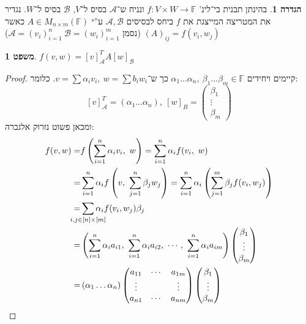 \documentclass[a4paper]{article}
\newcommand\ac    {\mathcal{A}}
\newcommand\bc    {\mathcal{B}}
\newcommand\F         {\mathbb{F}}
\newcommand\co        {\colon}
\newcommand\pms[1]    {\begin{pmatrix}
		#1
\end{pmatrix}}
\newcommand\ag        {\alpha}
\newcommand\bg        {\beta}
\newcommand\cl [1]    {\left ( #1 \right )}
\theoremstyle{definition}
\newtheorem{Theorem}{משפט}
\newtheorem{definition}{הגדרה}
\newcommand\theo  [1] {\begin{Theorem}#1\end{Theorem}}
\newcommand\defi  [1] {\begin{definition}#1\end{definition}}
\begin{document}
	\defi{בהינתן תבנית בי־לינ' $f \co V \times W \to \F$ ונניח ש־$\ac$ בסיס ל־$V$, $\bc$ בסיס ל־$W$. נגדיר את המטריצה המייצגת את $f$ ביחס לבסיסים $\ac, \bc$ ע''י $A \in M_{n \times m}(\F)$ כאשר $(A)_{ij} = f(v_i, w_j)$ (נסמן $\ac = (v_i)_{i =1}^n \ \bc = (w_i)_{i = 1}^{m}$)}
	
	\theo{$f(v, w) = [v]_{\ac}^T A [w]_\bc$}
	\begin{proof}
		
		קיימים ויחידים $\ag_1 \dots \ag_n, \ \bg_1 \dots \bg_m \in \F$ כך ש־$v = \sum \ag_i v_i, \ w = \sum b_iw_i$. 
		כלומר: 
		\[ [v]_\ac^T = (\ag_1 \dots \ag_n), \ [w]_B = \pms{\bg_1 \\ \vdots \\ \bg_m} \]
		ומכאן פשוט נזרוק אלגברה: 
		\begin{align*}
			f(v, w) = &f\cl{\sum_{i = 1}^{n}\ag_i v_i, \ w} = \sum_{i = 1}^{n}\ag_i f(v_i, \ w) \\
			= &\sum_{i = 1}^{n}\ag_i f\cl{v, \ \sum_{j = 1}^{n}\bg_j w_j} = \sum_{i = 1}^{n}\ag_i \cl{\sum_{j = 1}^{m}\bg_j f(v_i, w_j)} \\
			= &\sum_{\mathclap{i, j \in [n] \times [m]}} \ag_i f(v_i, w_j)\bg_j \\
			= &\cl{\sum_{i = 1}^{n}\ag_i a_{i1}, \ \sum_{i = 1}^{n}\ag_i a_{i2}, \ \cdots, \ \sum_{i = 1}^{n}\ag_i a_{im}}\pms{\bg_1 \\ \vdots \\ \bg_m} \\
			= &\,(\ag_1 \dots \ag_n)\pms{a_{11} &\cdots &a_{1m} \\ \vdots && \vdots \\ a_{n1} & \cdots & a_{nm}}\pms{\bg_1 \\ \vdots \\ \bg_{m}} 
		\end{align*}
	\end{proof}
	
\end{document}

